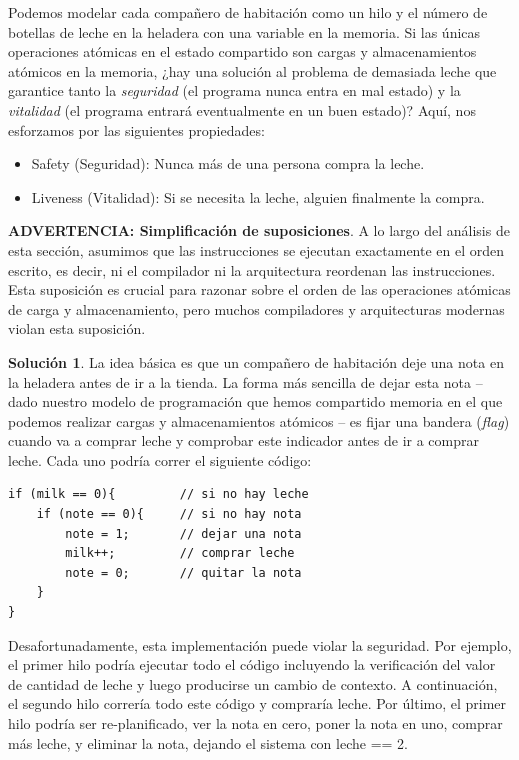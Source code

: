 \documentclass[10pt]{book}
\begin{document}
Podemos modelar cada compañero de habitación como un hilo y el número de botellas de leche en la heladera con una variable en la memoria. Si las únicas operaciones atómicas en el estado compartido son cargas y almacenamientos atómicos en la memoria, ¿hay una solución al problema de demasiada leche que garantice tanto la \textit{seguridad} (el programa nunca entra en mal estado) y la \textit{vitalidad} (el programa entrará eventualmente en un buen estado)? Aquí, nos esforzamos por las siguientes propiedades:
\begin{itemize}
\item Safety (Seguridad): Nunca más de una persona compra la leche.
\item Liveness (Vitalidad): Si se necesita la leche, alguien finalmente la compra.
\end{itemize}

\textbf{ADVERTENCIA: Simplificación de suposiciones}. A lo largo del análisis de esta sección, asumimos que las instrucciones se ejecutan exactamente en el orden escrito, es decir, ni el compilador ni la arquitectura reordenan las instrucciones. Esta suposición es crucial para razonar sobre el orden de las operaciones atómicas de carga y almacenamiento, pero muchos compiladores y arquitecturas modernas violan esta suposición.

\textbf{Solución 1}. La idea básica es que un compañero de habitación deje una nota en la heladera antes de ir a la tienda. La forma más sencilla de dejar esta nota -- dado nuestro modelo de programación que hemos compartido memoria en el que podemos realizar cargas y almacenamientos atómicos -- es fijar una bandera (\textit{flag}) cuando va a comprar leche y comprobar este indicador antes de ir a comprar leche. Cada uno podría correr el siguiente código:


\begin{lstlisting}
if (milk == 0){			// si no hay leche
	if (note == 0){		// si no hay nota
		note = 1;		// dejar una nota
		milk++;			// comprar leche
		note = 0;		// quitar la nota
	}
}
\end{lstlisting}

Desafortunadamente, esta implementación puede violar la seguridad. Por ejemplo, el primer hilo podría ejecutar todo el código incluyendo la verificación del valor de cantidad de leche y luego producirse un cambio de contexto. A continuación, el segundo hilo correría todo este código y compraría leche. Por último, el primer hilo podría ser re-planificado, ver la nota en cero, poner la nota en uno, comprar más leche, y eliminar la nota, dejando el sistema con {\mf leche == 2}.
\end{document}
